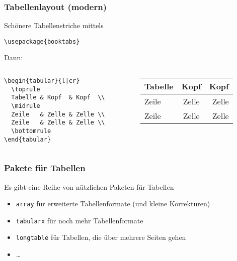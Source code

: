 \begin{frame}[fragile]
  \frametitle{Tabellenlayout (modern)}

  \onslide<+->

  Schönere Tabellenstriche mittels

\begin{lstlisting}
\usepackage{booktabs}
\end{lstlisting}

  \onslide<+->

  \bigskip

  Dann:

  \begin{columns}
    \begin{column}{0.55\linewidth}
\begin{lstlisting}
\begin{tabular}{l|cr}
  \toprule
  Tabelle & Kopf  & Kopf  \\
  \midrule
  Zeile   & Zelle & Zelle \\
  Zeile   & Zelle & Zelle \\
  \bottomrule
\end{tabular}
\end{lstlisting}
    \end{column}
    \begin{column}{0.45\linewidth}
      \centering
      \begin{tabular}{l|cr}
        \toprule
        Tabelle & Kopf & Kopf \\
        \midrule
        Zeile & Zelle & Zelle \\
        Zeile & Zelle & Zelle \\
        \bottomrule
      \end{tabular}
    \end{column}
  \end{columns}

\end{frame}

\begin{frame}
  \frametitle{Pakete für Tabellen}

  \onslide<+->

  Es gibt eine Reihe von nützlichen Paketen für Tabellen

  \begin{itemize}
  \item<+-> \lstinline!array! für erweiterte Tabellenformate (und kleine Korrekturen)
  \item<+-> \lstinline!tabularx! für noch mehr Tabellenformate
  \item<+-> \lstinline!longtable! für Tabellen, die über mehrere Seiten gehen
  \item<+-> \dots
  \end{itemize}

\end{frame}

